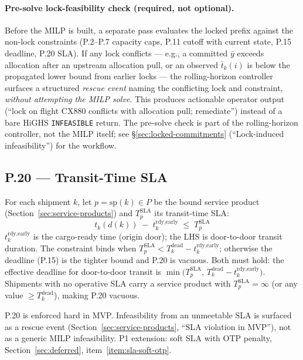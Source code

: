 \documentclass[11pt,a4paper]{article}
\theoremstyle{definition}
\begin{document}
\paragraph{Pre-solve lock-feasibility check (required, not optional).}
Before the MILP is built, a separate pass evaluates the locked prefix against the
non-lock constraints (P.2--P.7 capacity caps, P.11 cutoff with current state, P.15
deadline, P.20 SLA). If any lock conflicts --- e.g., a committed $\bar{y}$ exceeds
allocation after an upstream allocation pull, or an observed $\bar{t}_k(i)$ is below
the propagated lower bound from earlier locks --- the rolling-horizon controller
surfaces a structured \emph{rescue event} naming the conflicting lock and constraint,
\emph{without attempting the MILP solve}. This produces actionable operator output
(``lock on flight CX880 conflicts with allocation pull; remediate'') instead of a
bare HiGHS \texttt{INFEASIBLE} return. The pre-solve check is part of the
rolling-horizon controller, not the MILP itself; see \S\ref{sec:locked-commitments}
(``Lock-induced infeasibility'') for the workflow.

\subsection*{P.20 — Transit-Time SLA}

For each shipment $k$, let $p = \text{sp}(k) \in P$ be the bound service product
(Section~\ref{sec:service-products}) and $T_p^{\text{SLA}}$ its transit-time SLA:
\begin{equation}
  t_k(d(k)) \;-\; t_k^{\text{rdy,early}} \;\leq\; T_p^{\text{SLA}}
  \label{eq:P20}
\end{equation}
$t_k^{\text{rdy,early}}$ is the cargo-ready time (origin door); the LHS is door-to-door
transit duration. The constraint binds when $T_p^{\text{SLA}} < T_k^{\text{dead}} - t_k^{\text{rdy,early}}$;
otherwise the deadline (P.15) is the tighter bound and P.20 is vacuous. Both must
hold: the effective deadline for door-to-door transit is
$\min\bigl(T_p^{\text{SLA}},\, T_k^{\text{dead}} - t_k^{\text{rdy,early}}\bigr)$.
Shipments with no operative SLA carry a service product with $T_p^{\text{SLA}} = \infty$
(or any value $\geq T_k^{\text{dead}}$), making P.20 vacuous.

P.20 is enforced hard in MVP. Infeasibility from an unmeetable SLA is surfaced as a
rescue event (Section~\ref{sec:service-products}, ``SLA violation in MVP''),
not as a generic MILP infeasibility. P1 extension: soft SLA with OTP penalty,
Section~\ref{sec:deferred}, item~\ref{item:sla-soft-otp}.
\end{document}
